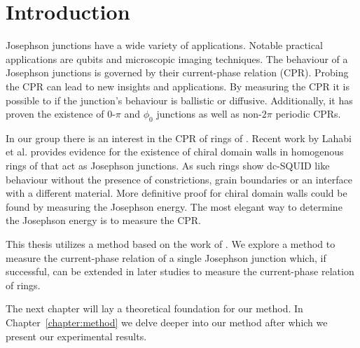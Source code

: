 \chapter{Introduction}
Josephson junctions have a wide variety of applications. Notable practical applications are qubits\cite{placeNewMaterialPlatform2021,pechenezhskiySuperconductingQuasichargeQubit2020} and microscopic imaging techniques\cite{clarkeSQUIDHandbook2004,rogSQUIDontipMagneticMicroscopy2022}. The behaviour of a Josephson junctions is governed by their current-phase relation (CPR). Probing the CPR can lead to new insights and applications. By measuring the CPR it is possible to if the junction's behaviour is ballistic or diffusive\cite{endresCurrentPhaseRelation2023a,kayyalhaHighlySkewedCurrent2020}. Additionally, it has proven the existence of $0$-$\pi$ and $\phi_0$ junctions\cite{frolovMeasurementCurrentPhaseRelation2004,muraniBallisticEdgeStates2017} as well as non-$2\pi$ periodic CPRs\cite{endresCurrentPhaseRelation2023}.

In our group there is an interest in the CPR of rings of . Recent work by Lahabi et al. provides evidence for the existence of chiral domain walls in homogenous rings of \cite{lahabiSpintripletSupercurrentsOdd2018} that act as Josephson junctions. As such  rings show dc-SQUID like behaviour without the presence of constrictions, grain boundaries or an interface with a different material. More definitive proof for chiral domain walls could be found by measuring the Josephson energy\cite{lahabiSpintripletSupercurrentsOdd2018,sigristRoleDomainWalls1999}. The most elegant way to determine the Josephson energy is to measure the CPR.

This thesis utilizes a method based on the work of \citeauthor{frolovMeasurementCurrentPhaseRelation2004} \cite{frolovMeasurementCurrentPhaseRelation2004,frolovCurrentphaseRelationsJosephson2005}. We explore a method to measure the current-phase relation of a single Josephson junction which, if successful, can be extended in later studies to measure the current-phase relation of  rings.

The next chapter will lay a theoretical foundation for our method. In Chapter~\ref{chapter:method} we delve deeper into our method after which we present our experimental results.